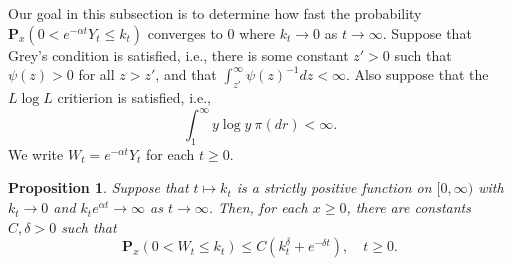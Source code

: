 \documentclass[12pt,a4paper]{amsart}
\theoremstyle{plain}
\newtheorem{prop}[thm]{Proposition}
\theoremstyle{definition}
\numberwithin{equation}{section}
\begin{document}
    Our goal in this subsection is to determine how fast the probability $\mathbf P_x(0<e^{-\alpha t}Y_t \leq k_t)$ converges to $0$ where $k_t \to 0$ as $t\to \infty$.
    Suppose that Grey's condition is satisfied, i.e., there is some constant $z' > 0$ such that $\psi(z) > 0$ for all $z>z'$, and that $\int_{z'}^\infty \psi(z)^{-1}dz < \infty$.
    Also suppose that the $L \log L$ critierion is satisfied, i.e.,
\[
    \int_1^\infty y \log y~\pi(dr)
    < \infty.
\]
    We write $W_t = e^{-\alpha t}Y_t$ for each $t\geq 0$.
\begin{prop}
\label{lem: control of XT}
    Suppose that $t\mapsto k_t$ is a strictly positive function on $[0,\infty)$ with $k_t \to 0$ and $k_t e^{\alpha t} \to \infty$ as $t\to \infty$.
    Then, for each $x\geq 0$, there are constants $C,\delta>0$ such that
\[
    \mathbf P_x(0<W_t\leq k_t) 
    \leq C(k_t^\delta + e^{-\delta t}), \quad t\geq 0.
\]
\end{prop}
\end{document}
